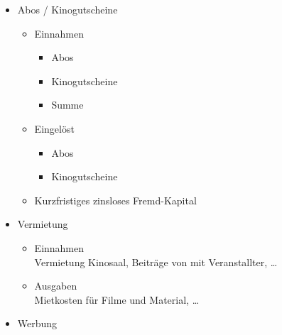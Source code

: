 \documentclass[
]{article}
\providecommand{\tightlist}{%
  \setlength{\itemsep}{0pt}\setlength{\parskip}{0pt}}
\begin{document}
\begin{itemize}
\begin{itemize}
    \begin{itemize}
    \tightlist
    \item
      Einkauf Getränke\\
      Die Getränke werden von Theater am Bahnhof eingekauft.\\
      Falls in der Tabelle ``\ldots/Kinoklub/input/\textbf{Einkauf Kiosk
      xx.xx.xx.xlsx}'' der Lieferant \textbf{``Schüwo''} definiert wurde
      wird der Verkaufsartikel als Getränk ausgegeben.\\
      Der Getränkeeinkauf wird mit \(A_{nzahl} \cdot E_{inkaufspreis}\)
      berechnet.
    \item
      Einkauf Kino\\
      Für alle Verkaufsartikel mit Ausnahme der Getränke wird in der
      Tabelle ``\ldots/Kinoklub/input/\textbf{Einnahmen und
      Ausgaben.xlsx}'' mit Kategorie \textbf{Kiosk} definiert.
    \end{itemize}
  \end{itemize}
\item
  Abos / Kinogutscheine

  \begin{itemize}
  \tightlist
  \item
    Einnahmen

    \begin{itemize}
    \tightlist
    \item
      Abos
    \item
      Kinogutscheine
    \item
      Summe
    \end{itemize}
  \item
    Eingelöst

    \begin{itemize}
    \tightlist
    \item
      Abos
    \item
      Kinogutscheine
    \end{itemize}
  \item
    Kurzfristiges zinsloses Fremd-Kapital
  \end{itemize}
\item
  Vermietung

  \begin{itemize}
  \tightlist
  \item
    Einnahmen\\
    Vermietung Kinosaal, Beiträge von mit Veranstallter, \ldots{}
  \item
    Ausgaben\\
    Mietkosten für Filme und Material, \ldots{}
  \end{itemize}
\item
  Werbung


\end{itemize}
\end{document}
